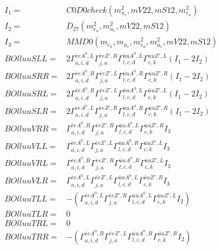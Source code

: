 \documentclass[A4,landscape]{article}
\begin{document}
\begin{align} 
I_1 = & C0D0check(m^2_{u_{{c}}}, mV22, mS12, m^2_{e_{{a}}}) \\ 
I_2 = & D_{27}(m^2_{e_{{a}}}, m^2_{u_{{c}}}, mV22, mS12) \\ 
I_3 = & MMD0(m_{e_{{a}}}, m_{u_{{c}}}, m^2_{e_{{a}}}, m^2_{u_{{c}}}, mV22, mS12) \\ 
  BOlluuSLL= & 2  \Gamma^{\bar{e}e A^0 ,L}_{a, i, d} \Gamma^{\bar{e}e {Z'} ,R}_{j, a} \Gamma^{\bar{u}u A^0 ,L}_{l, c, d} \Gamma^{\bar{u}u {Z'} ,L}_{c, k} (I_1 - 2 I_2) \\ 
  BOlluuSRR= & 2  \Gamma^{\bar{e}e A^0 ,R}_{a, i, d} \Gamma^{\bar{e}e {Z'} ,L}_{j, a} \Gamma^{\bar{u}u A^0 ,R}_{l, c, d} \Gamma^{\bar{u}u {Z'} ,R}_{c, k} (I_1 - 2 I_2) \\ 
  BOlluuSRL= & 2  \Gamma^{\bar{e}e A^0 ,R}_{a, i, d} \Gamma^{\bar{e}e {Z'} ,L}_{j, a} \Gamma^{\bar{u}u A^0 ,L}_{l, c, d} \Gamma^{\bar{u}u {Z'} ,L}_{c, k} (I_1 - 2 I_2) \\ 
  BOlluuSLR= & 2  \Gamma^{\bar{e}e A^0 ,L}_{a, i, d} \Gamma^{\bar{e}e {Z'} ,R}_{j, a} \Gamma^{\bar{u}u A^0 ,R}_{l, c, d} \Gamma^{\bar{u}u {Z'} ,R}_{c, k} (I_1 - 2 I_2) \\ 
  BOlluuVRR= &  \Gamma^{\bar{e}e A^0 ,R}_{a, i, d} \Gamma^{\bar{e}e {Z'} ,R}_{j, a} \Gamma^{\bar{u}u A^0 ,L}_{l, c, d} \Gamma^{\bar{u}u {Z'} ,R}_{c, k} I_3 \\ 
  BOlluuVLL= &  \Gamma^{\bar{e}e A^0 ,L}_{a, i, d} \Gamma^{\bar{e}e {Z'} ,L}_{j, a} \Gamma^{\bar{u}u A^0 ,R}_{l, c, d} \Gamma^{\bar{u}u {Z'} ,L}_{c, k} I_3 \\ 
  BOlluuVRL= &  \Gamma^{\bar{e}e A^0 ,R}_{a, i, d} \Gamma^{\bar{e}e {Z'} ,R}_{j, a} \Gamma^{\bar{u}u A^0 ,R}_{l, c, d} \Gamma^{\bar{u}u {Z'} ,L}_{c, k} I_3 \\ 
  BOlluuVLR= &  \Gamma^{\bar{e}e A^0 ,L}_{a, i, d} \Gamma^{\bar{e}e {Z'} ,L}_{j, a} \Gamma^{\bar{u}u A^0 ,L}_{l, c, d} \Gamma^{\bar{u}u {Z'} ,R}_{c, k} I_3 \\ 
  BOlluuTLL= & -( \Gamma^{\bar{e}e A^0 ,L}_{a, i, d} \Gamma^{\bar{e}e {Z'} ,R}_{j, a} \Gamma^{\bar{u}u A^0 ,L}_{l, c, d} \Gamma^{\bar{u}u {Z'} ,L}_{c, k} I_2) \\ 
  BOlluuTLR= & 0 \\ 
  BOlluuTRL= & 0 \\ 
  BOlluuTRR= & -( \Gamma^{\bar{e}e A^0 ,R}_{a, i, d} \Gamma^{\bar{e}e {Z'} ,L}_{j, a} \Gamma^{\bar{u}u A^0 ,R}_{l, c, d} \Gamma^{\bar{u}u {Z'} ,R}_{c, k} I_2) \\ 
\end{align} 
\end{document}
